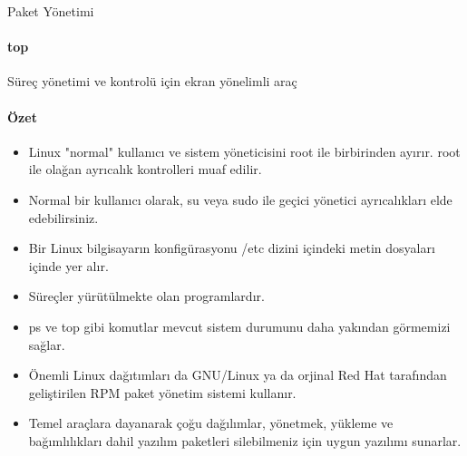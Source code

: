 \begin{section}{Paket Yönetimi}
{\paragraph{top}{Süreç yönetimi ve kontrolü için ekran yönelimli araç}
}

\paragraph{Özet}{
\begin{itemize}
\item Linux "normal" kullanıcı ve sistem yöneticisini root ile birbirinden ayırır. root ile olağan ayrıcalık kontrolleri muaf edilir.
\item Normal bir kullanıcı olarak, su veya sudo ile geçici yönetici ayrıcalıkları elde edebilirsiniz.
\item Bir Linux bilgisayarın konfigürasyonu /etc dizini içindeki metin dosyaları içinde yer alır.
\item Süreçler yürütülmekte olan programlardır.
\item ps ve top gibi komutlar mevcut sistem durumunu daha yakından görmemizi sağlar.
\item Önemli Linux dağıtımları da GNU/Linux ya da orjinal Red Hat tarafından geliştirilen RPM paket yönetim sistemi kullanır.
\item Temel araçlara dayanarak çoğu dağılımlar, yönetmek, yükleme ve bağımlılıkları dahil yazılım paketleri silebilmeniz için uygun yazılımı sunarlar.
\end{itemize}}
\end{section}